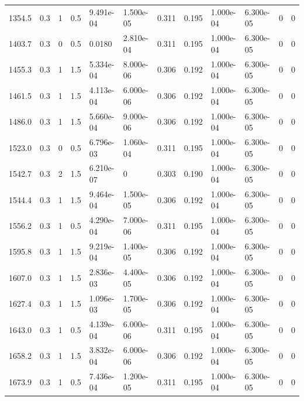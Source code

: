 \documentclass[preview]{standalone}
\begin{document}
{{\begin{tabular}{L{1.2cm}C{1.2cm} C{0.3cm}C{0.5cm} C{1.4cm}C{1.4cm} C{1.4cm}C{1.4cm} C{1.6cm}C{1.6cm} C{1.6cm}C{1.6cm}}
  1354.5  &   0.3  & 1     & 0.5 &  9.491e-04  & 1.500e-05  &  0.311&   0.195& 1.000e-04 & 6.300e-05   &  0 & 0  \\ 
  1403.7  &   0.3  & 0     & 0.5 &  0.0180  & 2.810e-04  &  0.311&   0.195& 1.000e-04 & 6.300e-05   &  0 & 0  \\ 
  1455.3  &   0.3  & 1     & 1.5 &  5.334e-04  & 8.000e-06  &  0.306&   0.192& 1.000e-04 & 6.300e-05   &  0 & 0  \\ 
  1461.5  &   0.3  & 1     & 1.5 &  4.113e-04  & 6.000e-06  &  0.306&   0.192& 1.000e-04 & 6.300e-05   &  0 & 0  \\ 
  1486.0  &   0.3  & 1     & 1.5 &  5.660e-04  & 9.000e-06  &  0.306&   0.192& 1.000e-04 & 6.300e-05   &  0 & 0  \\ 
  1523.0  &   0.3  & 0     & 0.5 &  6.796e-03  & 1.060e-04  &  0.311&   0.195& 1.000e-04 & 6.300e-05   &  0 & 0  \\ 
  1542.7  &   0.3  & 2     & 1.5 &  6.210e-07  & 0  &  0.303&   0.190& 1.000e-04 & 6.300e-05   &  0 & 0  \\ 
  1544.4  &   0.3  & 1     & 1.5 &  9.464e-04  & 1.500e-05  &  0.306&   0.192& 1.000e-04 & 6.300e-05   &  0 & 0  \\ 
  1556.2  &   0.3  & 1     & 0.5 &  4.290e-04  & 7.000e-06  &  0.311&   0.195& 1.000e-04 & 6.300e-05   &  0 & 0  \\ 
  1595.8  &   0.3  & 1     & 1.5 &  9.219e-04  & 1.400e-05  &  0.306&   0.192& 1.000e-04 & 6.300e-05   &  0 & 0  \\ 
  1607.0  &   0.3  & 1     & 1.5 &  2.836e-03  & 4.400e-05  &  0.306&   0.192& 1.000e-04 & 6.300e-05   &  0 & 0  \\ 
  1627.4  &   0.3  & 1     & 1.5 &  1.096e-03  & 1.700e-05  &  0.306&   0.192& 1.000e-04 & 6.300e-05   &  0 & 0  \\ 
  1643.0  &   0.3  & 1     & 0.5 &  4.139e-04  & 6.000e-06  &  0.311&   0.195& 1.000e-04 & 6.300e-05   &  0 & 0  \\ 
  1658.2  &   0.3  & 1     & 1.5 &  3.832e-04  & 6.000e-06  &  0.306&   0.192& 1.000e-04 & 6.300e-05   &  0 & 0  \\ 
  1673.9  &   0.3  & 1     & 0.5 &  7.436e-04  & 1.200e-05  &  0.311&   0.195& 1.000e-04 & 6.300e-05   &  0 & 0  \\ 
\hline 
\end{tabular} 

}}
\end{document}
